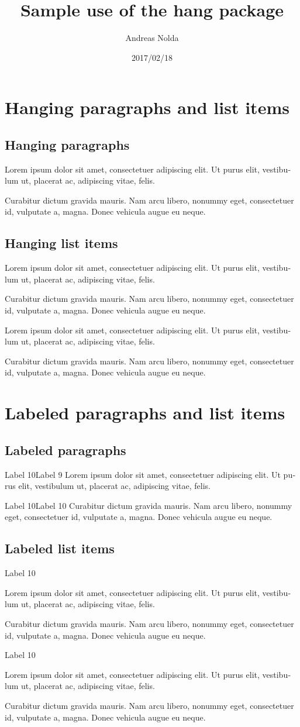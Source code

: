 \documentclass[a4paper]{ltxdoc}
\newcommand{\lipsumone}{\textlatin{Lorem ipsum dolor sit amet, consectetuer
adipiscing elit. Ut purus elit, vestibulum ut, placerat ac, adipiscing vitae,
felis.}}
\newcommand{\lipsumtwo}{\textlatin{Curabitur dictum gravida mauris. Nam arcu
libero, nonummy eget, consectetuer id, vulputate a, magna. Donec vehicula augue
eu neque.}}
\begin{document}
\title{Sample use of the \textsf{hang} package}
\author{Andreas Nolda}
\date{2017/02/18}
\maketitle

\section{Hanging paragraphs and list items}

\subsection{Hanging paragraphs}

\begin{hangingpar}
\lipsumone
\end{hangingpar}
\begin{hangingpar}
\lipsumtwo
\end{hangingpar}

\subsection{Hanging list items}

\begin{hanginglist}
\item{}\lipsumone
\item\lipsumtwo
\end{hanginglist}

\begin{compacthang}
\item{}\lipsumone
\item\lipsumtwo
\end{compacthang}

\section{Labeled paragraphs and list items}

\subsection{Labeled paragraphs}

\begin{labeledpar}{Label 10}{Label 9}
\lipsumone
\end{labeledpar}
\begin{labeledpar}{Label 10}{Label 10}
\lipsumtwo
\end{labeledpar}

\subsection{Labeled list items}

\begin{labeledlist}{Label 10}
\item[Label 9]\lipsumone
\item[Label 10]\lipsumtwo
\end{labeledlist}

\pagebreak
\begin{compactlabel}{Label 10}
\item[Label 9]\lipsumone
\item[Label 10]\lipsumtwo
\end{compactlabel}
\end{document}
